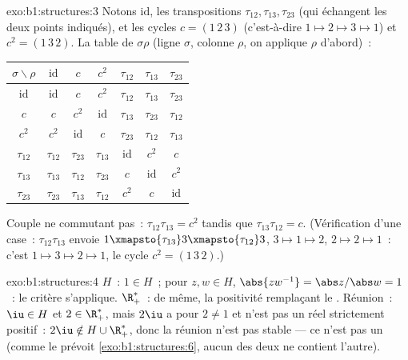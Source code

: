 \begin{solution}{exo:b1:structures:3}
Notons $\mathrm{id}$, les transpositions $\tau_{12}, \tau_{13},
\tau_{23}$ (qui échangent les deux points indiqués), et les cycles $c =
(1\,2\,3)$ (c'est-à-dire $1 \mapsto 2 \mapsto 3 \mapsto 1$) et $c^2 =
(1\,3\,2)$. La table de $\sigma\rho$ (ligne $\sigma$, colonne $\rho$,
on applique $\rho$ d'abord)~:
\begin{center}
\renewcommand{\arraystretch}{1.2}
\begin{tabular}{c|cccccc}
$\sigma\backslash\rho$ & $\mathrm{id}$ & $c$ & $c^2$ & $\tau_{12}$ &
$\tau_{13}$ & $\tau_{23}$ \\
\hline
$\mathrm{id}$ & $\mathrm{id}$ & $c$ & $c^2$ & $\tau_{12}$ &
$\tau_{13}$ & $\tau_{23}$ \\
$c$ & $c$ & $c^2$ & $\mathrm{id}$ & $\tau_{13}$ & $\tau_{23}$ &
$\tau_{12}$ \\
$c^2$ & $c^2$ & $\mathrm{id}$ & $c$ & $\tau_{23}$ & $\tau_{12}$ &
$\tau_{13}$ \\
$\tau_{12}$ & $\tau_{12}$ & $\tau_{23}$ & $\tau_{13}$ & $\mathrm{id}$
& $c^2$ & $c$ \\
$\tau_{13}$ & $\tau_{13}$ & $\tau_{12}$ & $\tau_{23}$ & $c$ &
$\mathrm{id}$ & $c^2$ \\
$\tau_{23}$ & $\tau_{23}$ & $\tau_{13}$ & $\tau_{12}$ & $c^2$ & $c$ &
$\mathrm{id}$ \\
\end{tabular}
\end{center}
Couple ne commutant pas~: $\tau_{12}\tau_{13} = c^2$ tandis que
$\tau_{13}\tau_{12} = c$. (Vérification d'une case~:
$\tau_{12}\tau_{13}$ envoie $1 \xmapsto{\tau_{13}} 3
\xmapsto{\tau_{12}} 3$, $3 \mapsto 1 \mapsto 2$, $2 \mapsto 2 \mapsto
1$~: c'est $1 \mapsto 3 \mapsto 2 \mapsto 1$, le cycle $c^2 =
(1\,3\,2)$.)
\end{solution}

\begin{solution}{exo:b1:structures:4}
$H$~: $1 \in H$~; pour $z, w \in H$, $\abs{zw^{-1}} = \abs z / \abs w =
1$~: le critère s'applique. $\R_+^*$~: de même, la positivité
remplaçant le . Réunion~: $\iu \in H$ et $2 \in \R_+^*$, mais
$2\iu$ a pour  $2 \neq 1$ et n'est pas un réel strictement
positif~: $2\iu \notin H \cup \R_+^*$, donc la réunion n'est pas stable
--- ce n'est pas un  (comme le prévoit
\cref{exo:b1:structures:6}, aucun des deux  ne contient
l'autre).
\end{solution}

